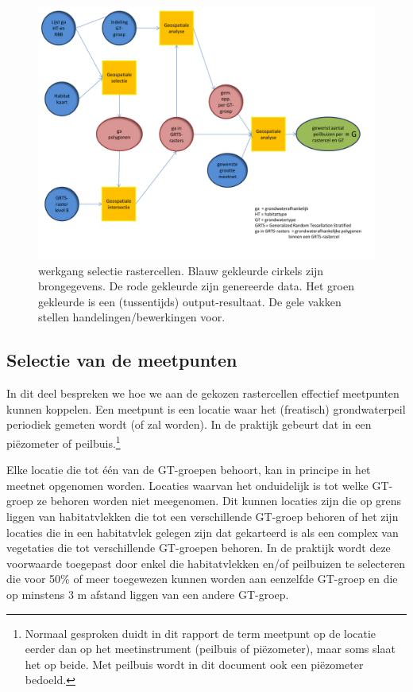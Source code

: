 \documentclass[11pt,]{book}
\let\rmarkdownfootnote\footnote%
\def\footnote{\protect\rmarkdownfootnote}
\begin{document}
\begin{figure}
\includegraphics[width=10in]{figures/workflow_rasterselectie} \caption{werkgang selectie rastercellen. Blauw
gekleurde cirkels zijn brongegevens. De rode gekleurde zijn genereerde
data. Het groen gekleurde is een (tussentijds) output-resultaat. De gele
vakken stellen handelingen/bewerkingen voor.}\label{fig:workflow-rastercellen}
\end{figure}

\subsection{Selectie van de
meetpunten}\label{selectie-van-de-meetpunten}

In dit deel bespreken we hoe we aan de gekozen rastercellen effectief
meetpunten kunnen koppelen. Een meetpunt is een locatie waar het
(freatisch) grondwaterpeil periodiek gemeten wordt (of zal worden). In
de praktijk gebeurt dat in een piëzometer of peilbuis.\footnote{Normaal
  gesproken duidt in dit rapport de term meetpunt op de locatie eerder
  dan op het meetinstrument (peilbuis of piëzometer), maar soms slaat
  het op beide. Met peilbuis wordt in dit document ook een piëzometer
  bedoeld.}

Elke locatie die tot één van de GT-groepen behoort, kan in principe in
het meetnet opgenomen worden. Locaties waarvan het onduidelijk is tot
welke GT-groep ze behoren worden niet meegenomen. Dit kunnen locaties
zijn die op grens liggen van habitatvlekken die tot een verschillende
GT-groep behoren of het zijn locaties die in een habitatvlek gelegen
zijn dat gekarteerd is als een complex van vegetaties die tot
verschillende GT-groepen behoren. In de praktijk wordt deze voorwaarde
toegepast door enkel die habitatvlekken en/of peilbuizen te selecteren
die voor 50\% of meer toegewezen kunnen worden aan eenzelfde GT-groep en
die op minstens 3 m afstand liggen van een andere GT-groep.
\end{document}
